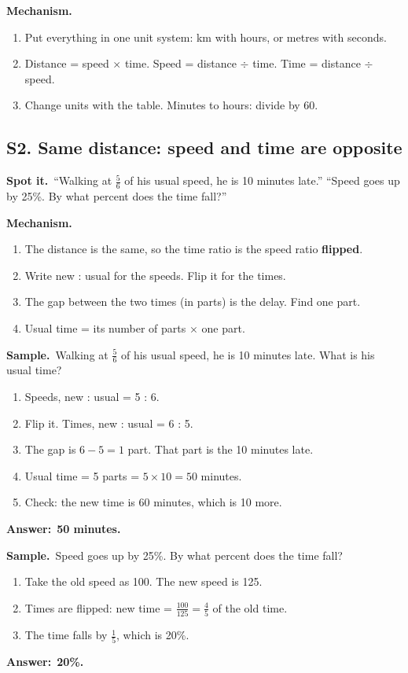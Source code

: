 \documentclass[11pt,a4paper]{article}
\let\oldsubsection\subsection
\renewcommand{\subsection}{\needspace{9\baselineskip}\oldsubsection}
\newcommand{\spot}{\textbf{\color{ember}Spot it.}\ }
\newcommand{\mech}{\textbf{\color{ember}Mechanism.}\ }
\newif\ifkeepsamp
\newcommand{\ans}[1]{\par\nopagebreak\noindent\textbf{\color{ember}Answer:}\ \textbf{#1}\par}
\newcommand{\samp}{\ifkeepsamp\needspace{4\baselineskip}\fi\textbf{\color{ember}Sample.}\ }
\begin{document}
\mech
\begin{enumerate}
\item Put everything in one unit system: km with hours, or metres with seconds.
\item Distance = speed $\times$ time. Speed = distance $\div$ time. Time = distance $\div$ speed.
\item Change units with the table. Minutes to hours: divide by 60.
\end{enumerate}

\subsection{S2. Same distance: speed and time are opposite}
\spot ``Walking at $\tfrac56$ of his usual speed, he is 10 minutes late.'' ``Speed goes up by 25\%. By what percent does the time fall?''

\mech
\begin{enumerate}
\item The distance is the same, so the time ratio is the speed ratio \textbf{flipped}.
\item Write new : usual for the speeds. Flip it for the times.
\item The gap between the two times (in parts) is the delay. Find one part.
\item Usual time = its number of parts $\times$ one part.
\end{enumerate}

\samp Walking at $\tfrac56$ of his usual speed, he is 10 minutes late. What is his usual time?
\begin{enumerate}
\item Speeds, new : usual = 5 : 6.
\item Flip it. Times, new : usual = 6 : 5.
\item The gap is $6 - 5 = 1$ part. That part is the 10 minutes late.
\item Usual time = 5 parts = $5 \times 10 = 50$ minutes.
\item Check: the new time is 60 minutes, which is 10 more.
\end{enumerate}
\ans{50 minutes.}

\samp Speed goes up by 25\%. By what percent does the time fall?
\begin{enumerate}
\item Take the old speed as 100. The new speed is 125.
\item Times are flipped: new time = $\tfrac{100}{125} = \tfrac45$ of the old time.
\item The time falls by $\tfrac15$, which is 20\%.
\end{enumerate}
\ans{20\%.}
\end{document}
